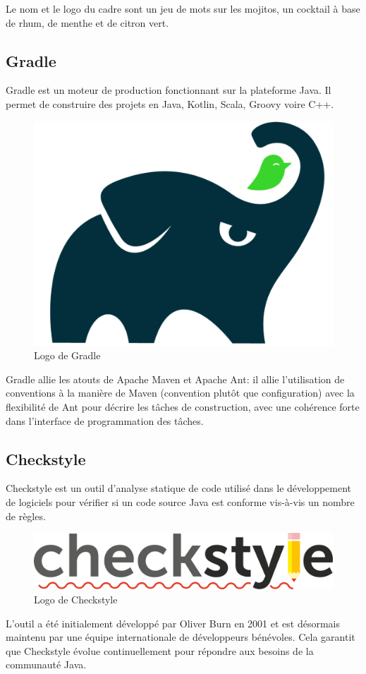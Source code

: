 \noindent Le nom et le logo du cadre sont un jeu de mots sur les mojitos, un cocktail à base de rhum, de menthe et de citron vert.      

\clearpage


\subsection{Gradle}

\noindent Gradle est un moteur de production fonctionnant sur la plateforme Java. Il permet de construire des projets en Java, Kotlin, Scala, Groovy voire C++. 

\begin{figure}[H]
    \centering
    \includegraphics[width=.25\textwidth]{logos/gradle.png}
    \caption{Logo de Gradle}
\end{figure}

\noindent Gradle allie les atouts de Apache Maven et Apache Ant: il allie l'utilisation de conventions à la manière de Maven (convention plutôt que configuration) avec la flexibilité de Ant pour décrire les tâches de construction, avec une cohérence forte dans l'interface de programmation des tâches. 


\subsection{Checkstyle}

\noindent Checkstyle est un outil d'analyse statique de code utilisé dans le développement de logiciels pour vérifier si un code source Java est conforme vis-à-vis un nombre de règles.

\begin{figure}[H]
    \centering
    \includegraphics[width=.35\textwidth]{logos/checkstyle.png}
    \caption{Logo de Checkstyle}
\end{figure}

\noindent L'outil a été initialement développé par Oliver Burn en 2001 et est désormais maintenu par une équipe internationale de développeurs bénévoles. Cela garantit que Checkstyle évolue continuellement pour répondre aux besoins de la communauté Java.


